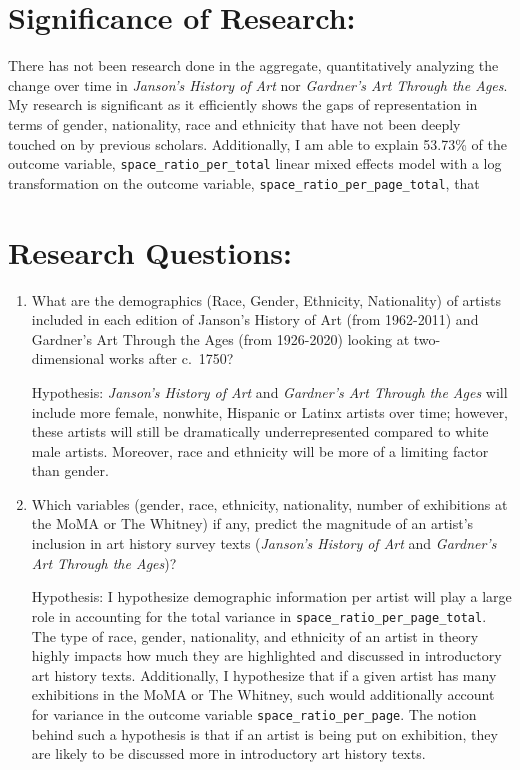 \documentclass[
  letterpaper,
  DIV=11,
  numbers=noendperiod]{scrreprt}
\begin{document}
\hypertarget{significance-of-research}{%
\chapter{\texorpdfstring{\textbf{Significance of
Research:}}{Significance of Research:}}\label{significance-of-research}}

There has not been research done in the aggregate, quantitatively
analyzing the change over time in \emph{Janson's History of Art} nor
\emph{Gardner's Art Through the Ages}. My research is significant as it
efficiently shows the gaps of representation in terms of gender,
nationality, race and ethnicity that have not been deeply touched on by
previous scholars. Additionally, I am able to explain 53.73\% of the
outcome variable, \texttt{space\_ratio\_per\_total} linear mixed effects
model with a log transformation on the outcome variable,
\texttt{space\_ratio\_per\_page\_total}, that

\hypertarget{research-questions}{%
\chapter{\texorpdfstring{\textbf{Research
Questions:}}{Research Questions:}}\label{research-questions}}

\begin{enumerate}
\def\labelenumi{\arabic{enumi}.}
\item
  What are the demographics (Race, Gender, Ethnicity, Nationality) of
  artists included in each edition of Janson's History of Art (from
  1962-2011) and Gardner's Art Through the Ages (from 1926-2020) looking
  at two-dimensional works after c.~1750?

  Hypothesis: \emph{Janson's History of Art} and \emph{Gardner's Art
  Through the Ages} will include more female, nonwhite, Hispanic or
  Latinx artists over time; however, these artists will still be
  dramatically underrepresented compared to white male artists.
  Moreover, race and ethnicity will be more of a limiting factor than
  gender.
\item
  Which variables (gender, race, ethnicity, nationality, number of
  exhibitions at the MoMA or The Whitney) if any, predict the magnitude
  of an artist's inclusion in art history survey texts (\emph{Janson's
  History of Art} and \emph{Gardner's Art Through the Ages})?

  Hypothesis: I hypothesize demographic information per artist will play
  a large role in accounting for the total variance in
  \texttt{space\_ratio\_per\_page\_total}. The type of race, gender,
  nationality, and ethnicity of an artist in theory highly impacts how
  much they are highlighted and discussed in introductory art history
  texts. Additionally, I hypothesize that if a given artist has many
  exhibitions in the MoMA or The Whitney, such would additionally
  account for variance in the outcome variable
  \texttt{space\_ratio\_per\_page}. The notion behind such a hypothesis
  is that if an artist is being put on exhibition, they are likely to be
  discussed more in introductory art history texts.
\end{enumerate}
\end{document}
